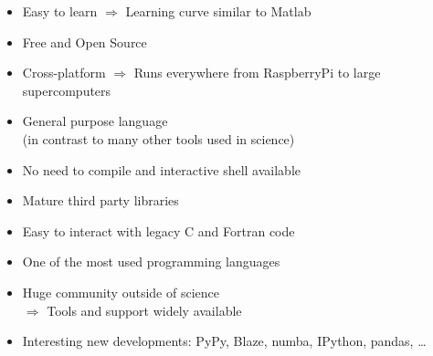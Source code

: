 \small
\begin{multicols}{2}
\begin{itemize}
    \item Easy to learn $\Rightarrow$ Learning curve similar to Matlab
    \item Free and  Open Source
    \item Cross-platform $\Rightarrow$ Runs everywhere from RaspberryPi to large supercomputers
    \item General purpose language\\(in contrast to many other tools used in science)
    \item No need to compile and interactive shell available
    \item Mature third party libraries
    \item Easy to interact with legacy C and Fortran code

    \item One of the most used programming languages
    \item Huge community outside of science\\$\Rightarrow$ Tools and support widely available
    \item Interesting new developments: PyPy, Blaze, numba, IPython, pandas, \dots
\end{itemize}
\end{multicols}
